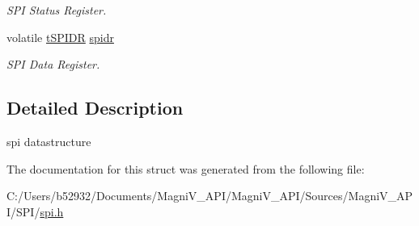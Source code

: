 \begin{DoxyCompactItemize}
\begin{DoxyCompactList}\small\item\em S\+P\+I Status Register. \end{DoxyCompactList}\item 
\hypertarget{structt_s_p_i_aecc1323b375d48d21a8cd8d33432cf2b}{}volatile \hyperlink{unionu_s_p_i_d_r}{t\+S\+P\+I\+D\+R} \hyperlink{structt_s_p_i_aecc1323b375d48d21a8cd8d33432cf2b}{spidr}\label{structt_s_p_i_aecc1323b375d48d21a8cd8d33432cf2b}

\begin{DoxyCompactList}\small\item\em S\+P\+I Data Register. \end{DoxyCompactList}\end{DoxyCompactItemize}


\subsection{Detailed Description}
spi datastructure 

The documentation for this struct was generated from the following file\+:\begin{DoxyCompactItemize}
\item 
C\+:/\+Users/b52932/\+Documents/\+Magni\+V\+\_\+\+A\+P\+I/\+Magni\+V\+\_\+\+A\+P\+I/\+Sources/\+Magni\+V\+\_\+\+A\+P\+I/\+S\+P\+I/\hyperlink{spi_8h}{spi.\+h}\end{DoxyCompactItemize}
